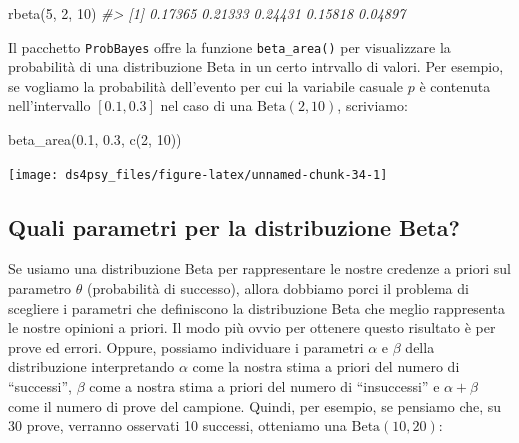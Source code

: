 \documentclass[
  11pt,
]{krantz}
\makeatletter
\newenvironment{Shaded}{\begin{snugshade}}{\end{snugshade}}
\newcommand{\CommentTok}[1]{\textcolor[rgb]{0.37,0.37,0.37}{\textit{#1}}}
\newcommand{\DecValTok}[1]{\textcolor[rgb]{0.06,0.06,0.06}{#1}}
\newcommand{\FloatTok}[1]{\textcolor[rgb]{0.06,0.06,0.06}{#1}}
\newcommand{\FunctionTok}[1]{\textcolor[rgb]{0,0,0}{#1}}
\newcommand{\NormalTok}[1]{#1}
\newenvironment{kframe}{%
\medskip{}
\setlength{\fboxsep}{.8em}
 \def\at@end@of@kframe{}%
 \ifinner\ifhmode%
  \def\at@end@of@kframe{\end{minipage}}%
  \begin{minipage}{\columnwidth}%
 \fi\fi%
 \def\FrameCommand##1{\hskip\@totalleftmargin \hskip-\fboxsep
 \colorbox{shadecolor}{##1}\hskip-\fboxsep
     \hskip-\linewidth \hskip-\@totalleftmargin \hskip\columnwidth}%
 \MakeFramed {\advance\hsize-\width
   \@totalleftmargin\z@ \linewidth\hsize
   \@setminipage}}%
 {\par\unskip\endMakeFramed%
 \at@end@of@kframe}
\renewenvironment{Shaded}{\begin{kframe}}{\end{kframe}}
\theoremstyle{definition}
\theoremstyle{definition}
\theoremstyle{definition}
\theoremstyle{definition}
\theoremstyle{remark}
\makeatother
\begin{document}
\begin{Shaded}
\begin{Highlighting}[]
\FunctionTok{rbeta}\NormalTok{(}\DecValTok{5}\NormalTok{, }\DecValTok{2}\NormalTok{, }\DecValTok{10}\NormalTok{)}
\CommentTok{\#\textgreater{} [1] 0.17365 0.21333 0.24431 0.15818 0.04897}
\end{Highlighting}
\end{Shaded}

Il pacchetto \texttt{ProbBayes} offre la funzione \texttt{beta\_area()} per visualizzare la probabilità di una distribuzione Beta in un certo intrvallo di valori. Per esempio, se vogliamo la probabilità dell'evento per cui la variabile casuale \(p\) è contenuta nell'intervallo \([0.1, 0.3]\) nel caso di una \(\mbox{Beta}(2, 10)\), scriviamo:

\begin{Shaded}
\begin{Highlighting}[]
\FunctionTok{beta\_area}\NormalTok{(}\FloatTok{0.1}\NormalTok{, }\FloatTok{0.3}\NormalTok{, }\FunctionTok{c}\NormalTok{(}\DecValTok{2}\NormalTok{, }\DecValTok{10}\NormalTok{))}
\end{Highlighting}
\end{Shaded}

\begin{center}\texttt{[image: ds4psy\_files/figure-latex/unnamed-chunk-34-1]} \end{center}

\hypertarget{quali-parametri-per-la-distribuzione-beta}{%
\subsection{Quali parametri per la distribuzione Beta?}\label{quali-parametri-per-la-distribuzione-beta}}

Se usiamo una distribuzione Beta per rappresentare le nostre credenze a priori sul parametro \(\theta\) (probabilità di successo), allora dobbiamo porci il problema di scegliere i parametri che definiscono la distribuzione Beta che meglio rappresenta le nostre opinioni a priori. Il modo più ovvio per ottenere questo risultato è per prove ed errori. Oppure, possiamo individuare i parametri \(\alpha\) e \(\beta\) della distribuzione interpretando \(\alpha\) come la nostra stima a priori del numero di ``successi'', \(\beta\) come a nostra stima a priori del numero di ``insuccessi'' e \(\alpha + \beta\) come il numero di prove del campione. Quindi, per esempio, se pensiamo che, su 30 prove, verranno osservati 10 successi, otteniamo una \(\mbox{Beta}(10, 20)\):
\end{document}
